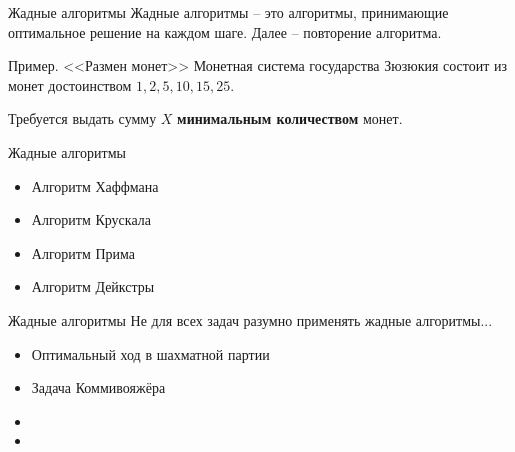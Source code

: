 \begin{frame}{Жадные алгоритмы}
	Жадные алгоритмы -- это алгоритмы, принимающие оптимальное решение на каждом шаге. Далее -- повторение алгоритма.
	
	\begin{block}{Пример. <<Размен монет>>}
		Монетная система государства Зюзюкия состоит из монет достоинством
		$1, 2, 5, 10, 15, 25$.
		
		Требуется выдать сумму $X$ \textbf{минимальным количеством} монет.
	\end{block}	
	
\end{frame}

\begin{frame}{Жадные алгоритмы}
	\begin{itemize}
		\item Алгоритм Хаффмана
		\item Алгоритм Крускала 
		\item Алгоритм Прима 
		\item Алгоритм Дейкстры
	\end{itemize}
\end{frame}


\begin{frame}{Жадные алгоритмы}
	Не для всех задач разумно применять жадные алгоритмы...
	
	
	\begin{itemize}
		\item Оптимальный ход в шахматной партии
		\item Задача Коммивояжёра
		\item {}
		\item {}
	\end{itemize}
\end{frame}










